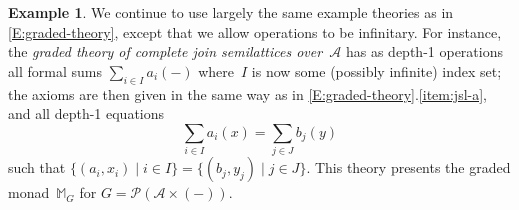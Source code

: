 \documentclass[sigconf,
			final%
			nonacm
                        ]{acmart}
\numberwithin{equation}{section}
\numberwithin{equation}{section}
\theoremstyle{plain}
\theoremstyle{definition}
\newtheorem{defn}[thm]{Definition}
\newtheorem{expl}[thm]{Example}
\newcommand{\M}{\mathbb{M}}                   %
\DeclareMathOperator{\Terms}{\mathscr{T}}
\newcommand{\Termsarg}[1]{\Terms_{\!#1}}
\newcommand{\A}{\mathcal{A}}            %
\newcommand{\pow}{\mathscr P}              %
\begin{document}
\begin{expl}
  We continue to use largely the same example theories as in
  \cref{E:graded-theory}, except that we allow operations to be
  infinitary. For instance, the \emph{graded theory of complete join
    semilattices over~$\A$} has as depth-1 operations all formal sums
  $\sum_{i\in I}a_i(-)$ where~$I$ is now some (possibly infinite)
  index set; the axioms are then given in the same way as in
  \cref{E:graded-theory}.\ref{item:jsl-a}, and all depth-1
  equations
  \[
    \textstyle \sum_{i\in I}a_i(x) = \sum_{j\in J} b_j(y)
  \]
  such that  $\{(a_i, x_i)\mid i\in I\}=\{(b_j, y_j)\mid j\in  J\}$.
  This theory presents the graded monad~$\M_G$ for
  $G=\pow(\A\times(-))$.  
\end{expl}
%
\end{document}
